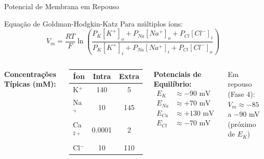 \begin{frame}{Potencial de Membrana em Repouso}
\begin{block}{Equação de Goldman-Hodgkin-Katz}
Para múltiplos íons:
\begin{equation*}
V_m = \frac{RT}{F}\ln\left(\frac{P_K[K^+]_o + P_{Na}[Na^+]_o + P_{Cl}[Cl^-]_i}{P_K[K^+]_i + P_{Na}[Na^+]_i + P_{Cl}[Cl^-]_o}\right)
\end{equation*}
\end{block}

\vspace{0.3cm}

\begin{columns}
\textbf{Concentrações Típicas (mM):}
\begin{center}
\begin{tabular}{lcc}
\toprule
\textbf{Íon} & \textbf{Intra} & \textbf{Extra} \\
\midrule
K$^+$ & 140 & 5 \\
Na$^+$ & 10 & 145 \\
Ca$^{2+}$ & 0.0001 & 2 \\
Cl$^-$ & 10 & 110 \\
\bottomrule
\end{tabular}
\end{center}

\textbf{Potenciais de Equilíbrio:}
\begin{align*}
E_K &\approx -90 \text{ mV} \\
E_{Na} &\approx +70 \text{ mV} \\
E_{Ca} &\approx +130 \text{ mV} \\
E_{Cl} &\approx -70 \text{ mV}
\end{align*}

Em repouso (Fase 4):\\
$V_m \approx -85$ a $-90$ mV\\
(próximo de $E_K$)
\end{columns}

\vspace{0.3cm}

\end{frame}

